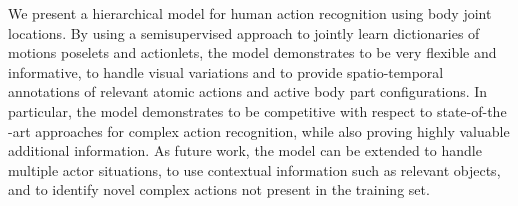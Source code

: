 We present a hierarchical model for 
human action recognition using body joint locations. By using a semisupervised approach to jointly 
learn dictionaries of motions poselets and actionlets, the model demonstrates to be very flexible 
and informative, to handle visual variations and to provide spatio-temporal annotations of 
relevant atomic actions and active body part configurations. In particular, the model demonstrates 
to be competitive with respect to state-of-the -art approaches for complex action recognition, 
while also proving highly valuable additional information. As future work, the model can be 
extended to handle multiple actor situations, to use contextual information such as relevant 
objects, and to identify novel complex actions not present in the training set.


